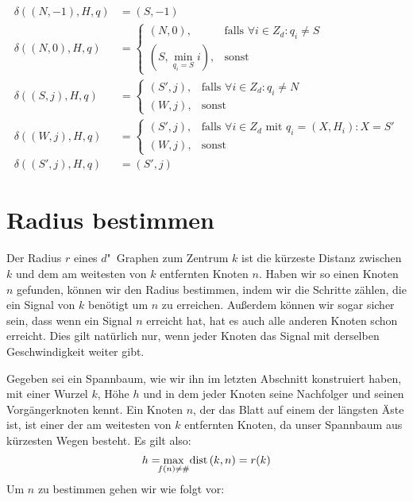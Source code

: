 \documentclass[11pt]{article}
\begin{document}
\begin{align*}
	\delta((N, -1), H, q) &= (S, -1) \\
	\delta((N, 0), H, q) &= \begin{cases}
							(N, 0), &\text{falls }\forall i \in Z_d : q_i \neq S \\
							(S, \min_{q_i = S} i), &\text{sonst}
						\end{cases} \\
	\delta((S, j), H, q) &= \begin{cases}
							(S', j), &\text{falls } \forall i \in Z_d : q_i \neq N \\
							(W, j),  & \text{sonst} 
						\end{cases} \\
	\delta((W, j), H, q) &= \begin{cases}
							(S', j), & \text{falls }\forall i \in Z_d \text{ mit } q_i = (X, H_i) : X = S' \\
							(W, j),  & \text{sonst} 
						\end{cases} \\
	\delta((S', j), H, q) &= (S', j)
\end{align*}

\section{Radius bestimmen}
Der Radius $r$ eines $d$"~Graphen zum Zentrum $k$ ist die kürzeste Distanz zwischen $k$ und dem am weitesten von $k$ entfernten Knoten $n$. 
Haben wir so einen Knoten $n$ gefunden, können wir den Radius bestimmen, indem wir die Schritte zählen, die ein Signal von $k$ benötigt um $n$ zu erreichen. 
Außerdem können wir sogar sicher sein, dass wenn ein Signal $n$ erreicht hat, hat es auch alle anderen Knoten schon erreicht. 
Dies gilt natürlich nur, wenn jeder Knoten das Signal mit derselben Geschwindigkeit weiter gibt.

Gegeben sei ein Spannbaum, wie wir ihn im letzten Abschnitt konstruiert haben, mit einer Wurzel $k$, Höhe $h$ und in dem jeder Knoten seine Nachfolger und seinen Vorgängerknoten kennt. 
Ein Knoten $n$, der das Blatt auf einem der längsten Äste ist, ist einer der am weitesten von $k$ entfernten Knoten, da unser Spannbaum aus kürzesten Wegen besteht. 
Es gilt also:
\begin{displaymath}
h = \max_{\mathclap{f\left(n\right) \neq \#}} \text{ dist}\left(k, n\right) = r(k)
\end{displaymath}
Um $n$ zu bestimmen gehen wir wie folgt vor:
\end{document}
